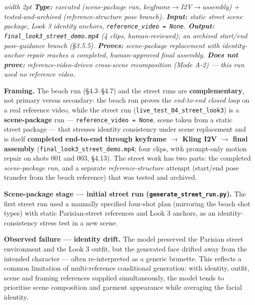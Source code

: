 \documentclass[10pt,twocolumn,letterpaper]{article}
\newenvironment{quotebox}%
 {\par\vspace{3pt}\noindent\begin{list}{}{\setlength{\leftmargin}{1em}\setlength{\rightmargin}{0.5em}}\item\footnotesize\itshape\color{black!80}\hspace*{-0.6em}\vrule width 2pt\hspace{0.6em}\ignorespaces}%
 {\end{list}\vspace{3pt}}
\begin{document}
\begin{quotebox}
\textbf{Type:} executed (scene-package run, keyframe$\rightarrow$I2V$\rightarrow$assembly) + tested-and-archived (reference-structure pose branch). \quad \textbf{Input:} static street scene package, Look 3 identity anchors, \texttt{reference\_video = None}. \quad \textbf{Output:} \texttt{final\_look3\_street\_demo.mp4} (4 clips, human-reviewed); an archived start/end pose-guidance branch (\S{}3.5.5). \quad \textbf{Proves:} scene-package replacement with identity-anchor repair reaches a completed, human-approved final assembly. \quad \textbf{Does not prove:} reference-video-driven cross-scene recomposition (Mode A-2) --- this run used no reference video.
\end{quotebox}

\textbf{Framing.} The beach run (\S{}4.3--\S{}4.7) and the street runs are \textbf{complementary}, not primary versus secondary: the beach run proves the \emph{end-to-end closed loop} on a real reference video, while the street run (\texttt{live\_test\_04\_street\_look3}) is a \textbf{scene-package} run --- \texttt{reference\_video = None}, scene taken from a static street package --- that stresses identity consistency under scene replacement and is itself \textbf{completed end-to-end through keyframe $\rightarrow$ Kling I2V $\rightarrow$ final assembly} (\texttt{final\_look3\_street\_demo.mp4}; four clips, with prompt-only motion repair on shots 001 and 003, \S{}4.13). The street work has two parts: the completed \emph{scene-package run}, and a separate \emph{reference-structure} attempt (start/end pose transfer from the beach reference) that was tested and archived.

\textbf{Scene-package stage --- initial street run (\texttt{generate\_street\_run.py}).} The first street run used a manually specified four-shot plan (mirroring the beach shot types) with static Parisian-street references and Look 3 anchors, as an identity-consistency stress test in a new scene.

\textbf{Observed failure --- identity drift.} The model preserved the Parisian street environment and the Look 3 outfit, but the generated face drifted away from the intended character --- often re-interpreted as a generic brunette. This reflects a common limitation of multi-reference conditional generation: with identity, outfit, scene and framing references supplied simultaneously, the model tends to prioritise scene composition and garment appearance while averaging the facial identity.
\end{document}

